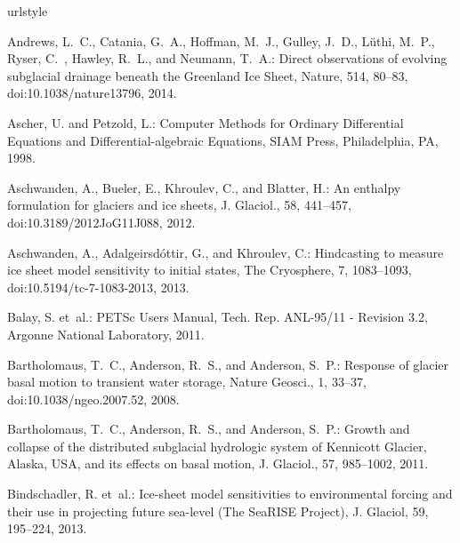 \documentclass[gmd]{copernicus}   %
\begin{document}
\begin{thebibliography}{}
\providecommand{\natexlab}[1]{#1}
\providecommand{\url}[1]{{\tt #1}}
\providecommand{\urlprefix}{URL }
\expandafter\ifx\csname urlstyle\endcsname\relax
  \providecommand{\doi}[1]{doi:\discretionary{}{}{}#1}\else
  \providecommand{\doi}{doi:\discretionary{}{}{}\begingroup
  \urlstyle{rm}\Url}\fi

Andrews, L.~C., Catania, G.~A., Hoffman, M.~J., Gulley, J.~D., L\"uthi, M.~P.,
  Ryser, C.~, Hawley, R.~L., and Neumann, T.~A.: Direct observations of evolving
  subglacial drainage beneath the {G}reenland {I}ce {S}heet, Nature, 514, 80--83,
  \doi{10.1038/nature13796}, 2014.

Ascher, U. and Petzold, L.: Computer {M}ethods for {O}rdinary {D}ifferential
  {E}quations and {D}ifferential-algebraic {E}quations, SIAM Press,
  Philadelphia, PA, 1998.

Aschwanden, A., Bueler, E., Khroulev, C., and Blatter, H.: An enthalpy
  formulation for glaciers and ice sheets, J. Glaciol., 58, 441--457,
  \doi{10.3189/2012JoG11J088}, 2012.

Aschwanden, A., Adalgeirsd{\'o}ttir, G., and Khroulev, C.: Hindcasting to
  measure ice sheet model sensitivity to initial states, The Cryosphere, 7,
  1083--1093, \doi{10.5194/tc-7-1083-2013}, 2013.

Balay, S. et~al.: {PETS}c {U}sers {M}anual, Tech. Rep. ANL-95/11 - Revision
  3.2, Argonne National Laboratory, 2011.

Bartholomaus, T.~C., Anderson, R.~S., and Anderson, S.~P.: Response of glacier
  basal motion to transient water storage, Nature Geosci., 1, 33--37,
  \doi{10.1038/ngeo.2007.52}, 2008.

Bartholomaus, T.~C., Anderson, R.~S., and Anderson, S.~P.: Growth and collapse
  of the distributed subglacial hydrologic system of {K}ennicott {G}lacier,
  {A}laska, {USA}, and its effects on basal motion, J. Glaciol., 57, 985--1002,
  2011.

Bindschadler, R. et~al.: Ice-sheet model sensitivities to environmental forcing
  and their use in projecting future sea-level ({T}he {S}ea{RISE} {P}roject),
  J. Glaciol, 59, 195--224, 2013.


\end{thebibliography}
\end{document}

